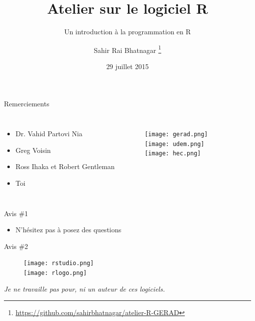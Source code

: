 \documentclass[11pt]{beamer}\usepackage[]{graphicx}\usepackage[]{color}
\begin{document}
\title[Atelier sur le logiciel R]{Atelier sur le logiciel R}
\subtitle{Un introduction \`{a} la programmation en R}

\author[]{Sahir Rai Bhatnagar%
\thanks{\href{https://github.com/sahirbhatnagar/atelier-R-GERAD}{https://github.com/sahirbhatnagar/atelier-R-GERAD}%
}}

\date{29 juillet 2015}


\maketitle

\begin{frame}{Remerciements}
\begin{columns}[c] %


\begin{itemize}
\item Dr. Vahid Partovi Nia
\item Greg Voisin
\item Ross Ihaka et Robert Gentleman
\item Toi
\end{itemize}

\begin{figure}
\texttt{[image: gerad.png]}\\[2mm]
\texttt{[image: udem.png]}\\[5mm]
\texttt{[image: hec.png]}
\end{figure}

\end{columns}
\end{frame}


\begin{frame}{Avis \#1}
\begin{itemize}
\item N'h\'{e}sitez pas \`{a} posez des questions
\end{itemize}
\end{frame}

\begin{frame}{Avis \#2}
\begin{figure}
\texttt{[image: rstudio.png]}\\[5mm]
\texttt{[image: rlogo.png]}\\[5mm]
\end{figure}

\textit{Je ne travaille pas pour, ni un auteur de ces logiciels.}

\end{frame}
\end{document}
